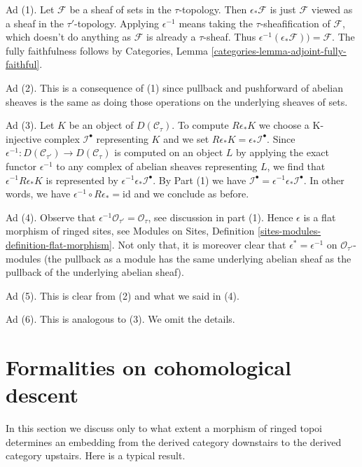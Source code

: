 \medskip\noindent
Ad (1). Let $\mathcal{F}$ be a sheaf of sets in the $\tau$-topology.
Then $\epsilon_*\mathcal{F}$ is just $\mathcal{F}$ viewed as a sheaf
in the $\tau'$-topology. Applying $\epsilon^{-1}$ means taking the
$\tau$-sheafification of $\mathcal{F}$, which doesn't do anything
as $\mathcal{F}$ is already a $\tau$-sheaf. Thus
$\epsilon^{-1}(\epsilon_*\mathcal{F})) = \mathcal{F}$.
The fully faithfulness follows by Categories, Lemma
\ref{categories-lemma-adjoint-fully-faithful}.

\medskip\noindent
Ad (2). This is a consequence of (1) since pullback and pushforward
of abelian sheaves is the same as doing those operations on the underlying
sheaves of sets.

\medskip\noindent
Ad (3). Let $K$ be an object of $D(\mathcal{C}_\tau)$.
To compute $R\epsilon_*K$ we choose a K-injective
complex $\mathcal{I}^\bullet$ representing $K$
and we set $R\epsilon_*K = \epsilon_*\mathcal{I}^\bullet$.
Since $\epsilon^{-1} : D(\mathcal{C}_{\tau'}) \to D(\mathcal{C}_\tau)$
is computed on an object $L$ by applying the exact functor $\epsilon^{-1}$
to any complex of abelian sheaves representing $L$, we find that
$\epsilon^{-1}R\epsilon_*K$ is represented by
$\epsilon^{-1}\epsilon_*\mathcal{I}^\bullet$. By
Part (1) we have
$\mathcal{I}^\bullet = \epsilon^{-1}\epsilon_*\mathcal{I}^\bullet$.
In other words, we have $\epsilon^{-1} \circ R\epsilon_* = \text{id}$
and we conclude as before.

\medskip\noindent
Ad (4). Observe that $\epsilon^{-1}\mathcal{O}_{\tau'} = \mathcal{O}_\tau$, see
discussion in part (1). Hence $\epsilon$ is a flat morphism of ringed
sites, see
Modules on Sites, Definition \ref{sites-modules-definition-flat-morphism}.
Not only that, it is moreover clear that $\epsilon^* = \epsilon^{-1}$
on $\mathcal{O}_{\tau'}$-modules (the pullback as a module has the same
underlying abelian sheaf as the pullback of the underlying abelian sheaf).

\medskip\noindent
Ad (5). This is clear from (2) and what we said in (4).

\medskip\noindent
Ad (6). This is analogous to (3). We omit the details.

\section{Formalities on cohomological descent}
\label{sites-cohomology-section-formal-cohomological-descent}
In this section we discuss only to what extent a morphism
of ringed topoi determines an embedding from the derived
category downstairs to the derived category upstairs.
Here is a typical result.

